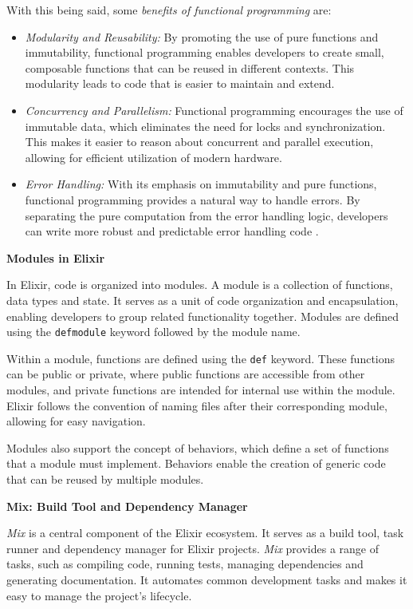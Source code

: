 With this being said, some \textit{benefits of functional programming} are:

\begin{itemize}
    \item \textit{Modularity and Reusability:} By promoting the use of pure functions and immutability, functional programming enables developers to create small, composable functions that can be reused in different contexts. This modularity leads to code that is easier to maintain and extend.
    \item \textit{Concurrency and Parallelism:} Functional programming encourages the use of immutable data, which eliminates the need for locks and synchronization. This makes it easier to reason about concurrent and parallel execution, allowing for efficient utilization of modern hardware.
    \item \textit{Error Handling:} With its emphasis on immutability and pure functions, functional programming provides a natural way to handle errors. By separating the pure computation from the error handling logic, developers can write more robust and predictable error handling code \cite{func}.
\end{itemize}

\textbf{Modules in Elixir}\newline

In Elixir, code is organized into modules. A module is a collection of functions, data types and state. It serves as a unit of code organization and encapsulation, enabling developers to group related functionality together. Modules are defined using the \texttt{defmodule} keyword followed by the module name.

Within a module, functions are defined using the \texttt{def} keyword. These functions can be public or private, where public functions are accessible from other modules, and private functions are intended for internal use within the module. Elixir follows the convention of naming files after their corresponding module, allowing for easy navigation.

Modules also support the concept of behaviors, which define a set of functions that a module must implement. Behaviors enable the creation of generic code that can be reused by multiple modules.\newline

\textbf{Mix: Build Tool and Dependency Manager}\newline

\textit{Mix} is a central component of the Elixir ecosystem. It serves as a build tool, task runner and dependency manager for Elixir projects. \textit{Mix} provides a range of tasks, such as compiling code, running tests, managing dependencies and generating documentation. It automates common development tasks and makes it easy to manage the project's lifecycle.

